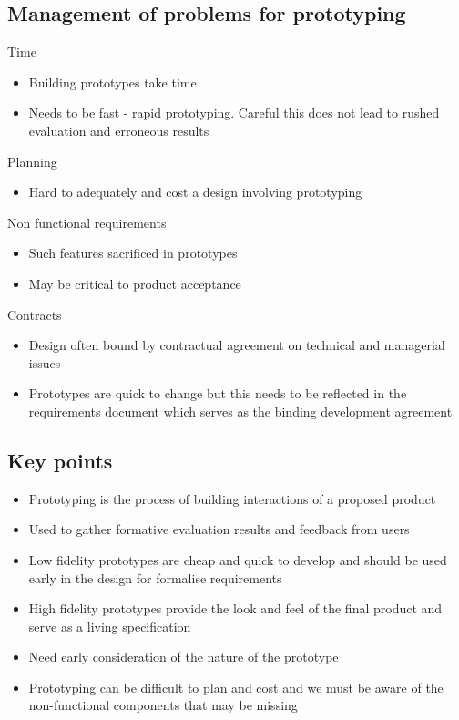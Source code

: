 \documentclass{article}[18pt]
\begin{document}
\subsection{Management of problems for prototyping}
Time
\begin{itemize}
	\item Building prototypes take time
	\item Needs to be fast - rapid prototyping. Careful this does not lead to rushed evaluation and erroneous results
\end{itemize}
Planning
\begin{itemize}
	\item Hard to adequately and cost a design involving prototyping
\end{itemize}
Non functional requirements
\begin{itemize}
	\item Such features sacrificed in prototypes
	\item May be critical to product acceptance
\end{itemize}
Contracts
\begin{itemize}
	\item Design often bound by contractual agreement on technical and managerial issues
	\item Prototypes are quick to change but this needs to be reflected in the requirements document which serves as the binding development agreement
\end{itemize}
\subsection{Key points}
\begin{itemize}
	\item Prototyping is the process of building interactions of a proposed product
	\item Used to gather formative evaluation results and feedback from users
	\item Low fidelity prototypes are cheap and quick to develop and should be used early in the design for formalise requirements
	\item High fidelity prototypes provide the look and feel of the final product and serve as a living specification
	\item Need early consideration of the nature of the prototype
	\item Prototyping can be difficult to plan and cost and we must be aware of the non-functional components that may be missing
\end{itemize}
\end{document}
